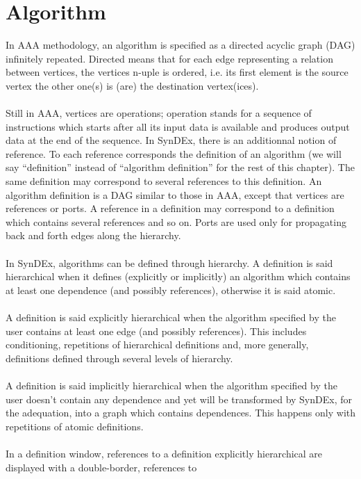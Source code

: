 \documentclass[11pt,twoside]{report}
\begin{document}
\chapter{Algorithm}
In AAA methodology, an algorithm is specified as a directed acyclic
graph (DAG) infinitely repeated. Directed means that for each edge
representing a relation between vertices, the vertices n-uple is
ordered, i.e. its first element is the source
vertex the other one(s) is (are) the destination vertex(ices).\\\\
Still in AAA, vertices are operations; operation stands for a sequence
of instructions which starts after all its input data is available and
produces output data at the end of the sequence.  In SynDEx, there is
an additionnal notion of reference. To each reference corresponds the
definition of an algorithm (we will say ``definition'' instead of
``algorithm definition'' for the rest of this chapter). The same
definition may correspond to several references to this definition.
An algorithm definition is a DAG similar to those in AAA, except that
vertices are references or ports. A reference in a definition may
correspond to a definition which contains several references and so
on. Ports are used only for propagating back and
forth edges along the hierarchy.\\\\
In SynDEx, algorithms can be defined through hierarchy. A definition
is said hierarchical when it defines (explicitly or implicitly) an
algorithm which contains at least one dependence (and possibly
references), otherwise it is said
atomic.\\\\
A definition is said explicitly hierarchical when the algorithm
specified by the user contains at least one edge (and possibly
references). This includes conditioning, repetitions of hierarchical
definitions and, more generally, definitions defined
through several levels of hierarchy.\\\\
A definition is said implicitly hierarchical when the algorithm
specified by the user doesn't contain any dependence and yet will be
transformed by SynDEx, for the adequation, into a graph which contains
dependences. This happens only with
repetitions of atomic definitions.\\\\
In a definition window, references to a definition explicitly
hierarchical are displayed with a double-border, references to
\end{document}
